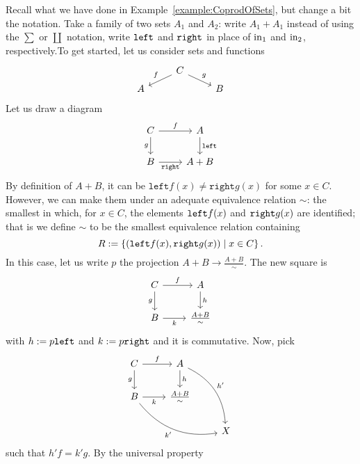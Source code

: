 \begin{example}\label{example:PushoutsInSet}
  Recall what we have done in Example~\ref{example:CoprodOfSets}, but
  change a bit the notation. Take a family of two sets \(A_1\) and
  \(A_2\): write \(A_1+A_1\) instead of using the \(\sum\) or
  \(\coprod\) notation, write \(\mathtt{left}\) and \(\mathtt{right}\) in place of
  \(\operatorname{in}_1\) and \(\operatorname{in}_2\), respectively.\newline To get started, let us
  consider sets and functions
  \[\begin{tikzcd}[row sep=tiny]
      & C \ar["f", dl, swap] \ar["g", dr] &   \\
      A & & B
    \end{tikzcd}\] Let us draw a diagram
  \begin{equation}\begin{tikzcd}
      C \ar["f", r] \ar["g", d, swap]  & A \ar["\linj", d] \\
      B \ar["\rinj", r, swap] & A+B
    \end{tikzcd}\label{diagram:NotYetACommSquareInSet}\end{equation}
  By definition of \(A+B\), it can be
  \(\mathtt{left} f(x) \ne \mathtt{right} g(x)\) for some \(x \in
  C\). However, we can make them  under an adequate
  equivalence relation \(\sim\): the smallest in which, for
  \(x \in C\), the elements \(\mathtt{left} f(x)\) and \(\mathtt{right} g(x)\) are
  identified; that is we define \(\sim\) to be the smallest equivalence
  relation containing
  \[R := \left\{(\mathtt{left} f(x), \mathtt{right} g(x)) \mid x \in C\right\}.\] In this case, let
  us write \(p\) the projection \(A+B \to \frac{A+B}{\sim}\). The new
  square is
  \begin{equation}\begin{tikzcd}
      C \ar["f", r] \ar["g", d, swap] & A \ar["h", d]    \\
      B \ar["k", r, swap] & \frac{A+B}{\sim}
    \end{tikzcd}\label{diagram:NowACommSquareInSet}\end{equation}
  with \(h := p \mathtt{left}\) and \(k := p \mathtt{right}\) and it is
  commutative. Now, pick
  \[\begin{tikzcd}
      C \ar["f", r] \ar["g", d, swap] & A \ar["h", d] \ar["{h'}", ddr, bend left] \\
      B \ar["k", r, swap] \ar["{k'}", drr, bend right, swap] & \frac{A+B}{\sim} \\
      & & X
    \end{tikzcd}\] such that \(h'f = k'g\). By the universal property

\end{example}
